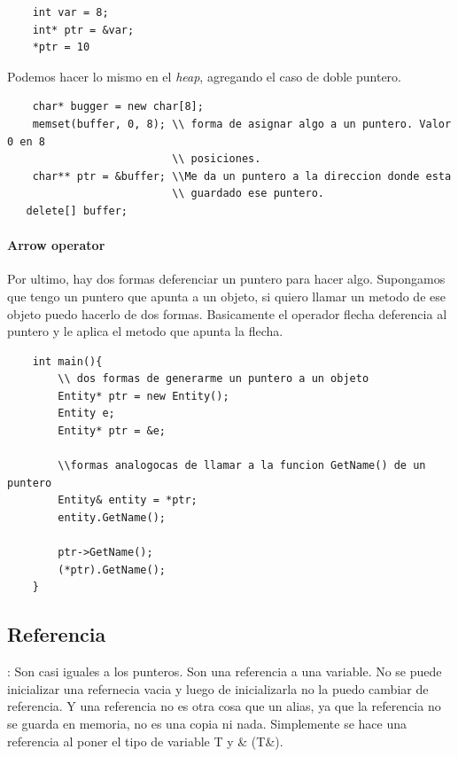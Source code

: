 \documentclass[11pt]{article}
\begin{document}
\begin{lstlisting}
    int var = 8;
    int* ptr = &var;
    *ptr = 10
\end{lstlisting}

Podemos hacer lo mismo en el \textit{heap}, agregando el caso de doble puntero.
\begin{lstlisting}
    char* bugger = new char[8];
    memset(buffer, 0, 8); \\ forma de asignar algo a un puntero. Valor 0 en 8
                          \\ posiciones.
    char** ptr = &buffer; \\Me da un puntero a la direccion donde esta
                          \\ guardado ese puntero.
   delete[] buffer;
\end{lstlisting}

\paragraph{Arrow operator}
Por ultimo, hay dos formas deferenciar un puntero para hacer algo.
Supongamos que tengo un puntero que apunta a un objeto,
si quiero llamar un metodo de ese objeto puedo hacerlo de dos formas.
Basicamente el operador flecha deferencia al puntero y le aplica el metodo
que apunta la flecha.

\begin{lstlisting}
    int main(){
        \\ dos formas de generarme un puntero a un objeto
        Entity* ptr = new Entity();
        Entity e;
        Entity* ptr = &e;

        \\formas analogocas de llamar a la funcion GetName() de un puntero
        Entity& entity = *ptr;
        entity.GetName();

        ptr->GetName();
        (*ptr).GetName();
    }
\end{lstlisting}



\subsection{Referencia}:
Son casi iguales a los punteros.
Son una referencia a una variable.
No se puede inicializar una refernecia vacia y luego de inicializarla no la puedo
cambiar de referencia.
Y una referencia no es otra cosa que un alias, ya que la referencia no se guarda
en memoria, no es una copia ni nada.
Simplemente se hace una referencia al poner el tipo de variable T y \& (T\&).
\end{document}
